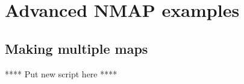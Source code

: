 %
%
\chapter{Advanced NMAP examples}
\tableofcontents 

\section{Making multiple maps}
\label{nmap.example.makemult}

**** Put new script here ****
